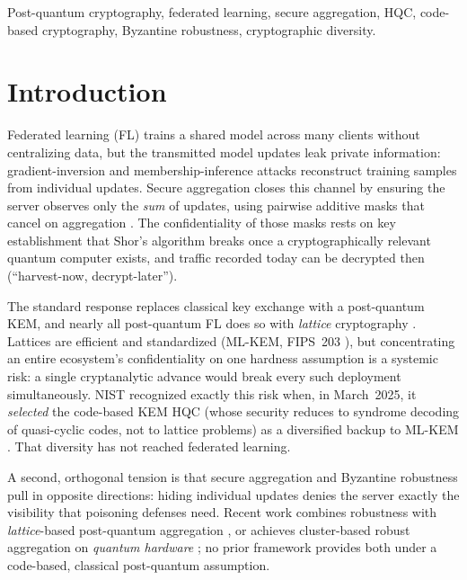 \documentclass[conference]{IEEEtran}
\begin{document}
\begin{IEEEkeywords}
Post-quantum cryptography, federated learning, secure aggregation, HQC, code-based
cryptography, Byzantine robustness, cryptographic diversity.
\end{IEEEkeywords}

\section{Introduction}
Federated learning (FL) trains a shared model across many clients without
centralizing data, but the transmitted model updates leak private information:
gradient-inversion and membership-inference attacks reconstruct training samples from
individual updates. Secure aggregation closes this channel by ensuring the server
observes only the \emph{sum} of updates, using pairwise additive masks that cancel on
aggregation \cite{bonawitz2017,bell2020}. The confidentiality of those masks rests on key
establishment that Shor's algorithm breaks once a cryptographically relevant quantum
computer exists, and traffic recorded today can be decrypted then
(``harvest-now, decrypt-later'').

The standard response replaces classical key exchange with a post-quantum KEM, and
nearly all post-quantum FL does so with \emph{lattice} cryptography
\cite{pqsf2024,qinxu2025,narsimhulu2026,nguyen2025lattice,byzpqfl2026}. Lattices are
efficient and standardized (ML-KEM, FIPS~203 \cite{fips203}), but concentrating an
entire ecosystem's confidentiality on one hardness assumption is a systemic risk: a
single cryptanalytic advance would break every such deployment simultaneously. NIST
recognized exactly this risk when, in March~2025, it \emph{selected} the code-based
KEM HQC (whose security reduces to syndrome decoding of quasi-cyclic codes, not to
lattice problems) as a diversified backup to ML-KEM \cite{nistir8545}. That
diversity has not reached federated learning.

A second, orthogonal tension is that secure aggregation and Byzantine robustness pull
in opposite directions: hiding individual updates denies the server exactly the
visibility that poisoning defenses need. Recent work combines robustness with
\emph{lattice}-based post-quantum aggregation \cite{byzpqfl2026}, or achieves
cluster-based robust aggregation on \emph{quantum hardware} \cite{cqsa2026}; no prior
framework provides both under a code-based, classical post-quantum assumption.
\end{document}

